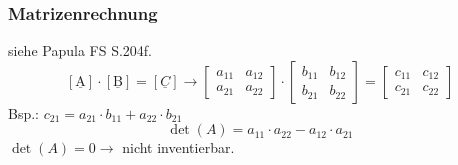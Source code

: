 \subsubsection{Matrizenrechnung}
siehe Papula FS S.204f.
\[  [\operatorname{\underline{A}}]\cdot [\operatorname{\underline{B}}] = [\underline{C}] \rightarrow  \begin{bmatrix}
	a_{11} & a_{12}\\ 
	a_{21} & a_{22} 
\end{bmatrix}
\cdot
\begin{bmatrix}
	b_{11} & b_{12}\\ 
	b_{21} & b_{22}  
\end{bmatrix}
=
\begin{bmatrix}
	c_{11} & c_{12}\\ 
	c_{21} & c_{22}   
\end{bmatrix} \] 
Bsp.: $c_{21}=a_{21}\cdot b_{11} + a_{22} \cdot b_{21}$
\[ \det(A)=a_{11}\cdot a_{22} - a_{12} \cdot a_{21} \] 
$\det(A)=0 \rightarrow$ nicht inventierbar.
